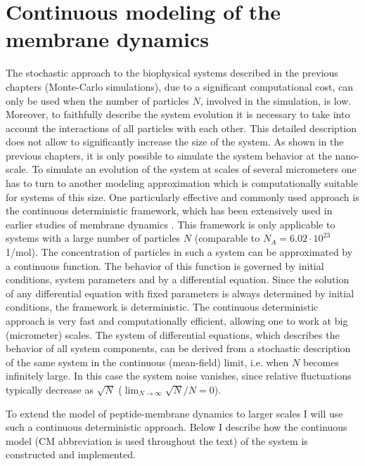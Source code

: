 \chapter{Continuous modeling of the membrane dynamics}

\label{continuous_model_description}

The stochastic approach to the biophysical systems described in the previous chapters (Monte-Carlo simulations), due to a significant computational cost, can only be used when the number of particles $N$, involved in the simulation, is low. Moreover, to faithfully describe the system evolution it is necessary to take into account the interactions of all particles with each other. This detailed description does not allow to significantly increase the size of the system. As shown in the previous chapters, it is only possible to simulate the system behavior at the nano- scale. To simulate an evolution of the system at scales of several micrometers one has to turn to another modeling approximation which is computationally suitable for systems of this size. One particularly effective and commonly used approach is the continuous deterministic framework, which has been extensively used in earlier studies of membrane dynamics \cite{May2000,Khelashvili2008}. This framework is only applicable to systems with a large number of particles $N$ (comparable to $N_A = 6.02\cdotp10^{23}$ 1/mol). The concentration of particles in such a system can be approximated by a continuous function. The behavior of this function is governed by initial conditions, system parameters and by a differential equation. Since the solution of any differential equation with fixed parameters is always determined by initial conditions, the framework is deterministic. The continuous deterministic approach is very fast and computationally efficient, allowing one to work at big (micrometer) scales. The system of differential equations, which describes the behavior of all system components, can be derived from a stochastic description of the same system in the continuous (mean-field) limit, i.e. when $N$ becomes infinitely large. In this case the system noise vanishes, since relative fluctuations typically decrease as $\sqrt{N}$ ($\lim_{N\to\infty}\sqrt{N}/N = 0$).

To extend the model of peptide-membrane dynamics to larger scales I will use such a continuous deterministic approach. Below I describe how the continuous model (CM abbreviation is used throughout the text) of the system is constructed and implemented.

